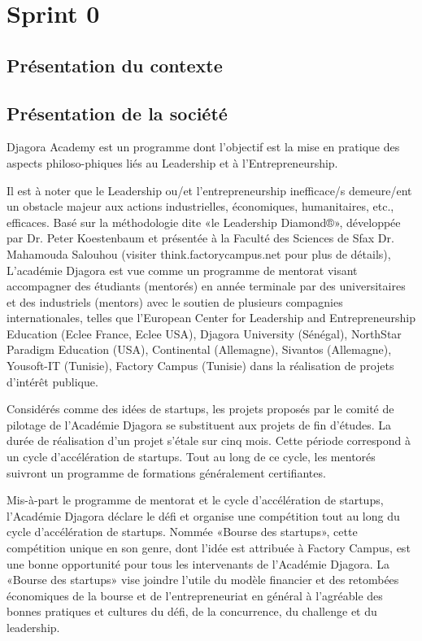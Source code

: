 \section{Sprint 0}
\subsection{Présentation du contexte}

\subsection{Présentation de la société}
Djagora Academy est un programme dont l’objectif est la mise en pratique des 
aspects  philoso-phiques liés au Leadership et à l’Entrepreneurship.

Il est à noter que le Leadership ou/et l’entrepreneurship inefficace/s demeure/ent un obstacle 
majeur aux actions industrielles, économiques, humanitaires, etc., efficaces. 
Basé sur la méthodologie dite «le Leadership Diamond®», développée par
Dr. Peter Koestenbaum et présentée à la Faculté des Sciences de Sfax Dr. Mahamouda
Salouhou (visiter think.factorycampus.net pour plus de détails), L’académie 
Djagora est vue comme un programme de mentorat visant accompagner des étudiants 
(mentorés) en année terminale par des universitaires et des industriels (mentors) 
avec le soutien de plusieurs compagnies internationales, telles que l’European 
Center for Leadership and Entrepreneurship Education (Eclee France, Eclee USA), 
Djagora University (Sénégal), NorthStar Paradigm Education (USA), Continental 
(Allemagne), Sivantos (Allemagne), Yousoft-IT (Tunisie), Factory Campus (Tunisie)
dans la réalisation de projets d’intérêt publique.

Considérés comme des idées de startups, les projets proposés par
le comité de pilotage de l'Académie Djagora se substituent aux projets de fin
d’études.
La durée de réalisation d’un projet s’étale sur cinq mois. Cette période
correspond à un cycle d’accélération de startups. Tout au long de ce cycle,
les mentorés suivront un programme de formations généralement certifiantes.

Mis-à-part le programme de mentorat et le cycle d’accélération de startups, 
l’Académie Djagora déclare le défi et organise une compétition tout au long
du cycle d’accélération de startups. Nommée «Bourse des startups», cette 
compétition unique en son genre, dont l’idée est attribuée à Factory Campus,
est une bonne opportunité pour tous les intervenants de l’Académie Djagora.
La «Bourse des startups» vise joindre l’utile du modèle financier et des retombées 
économiques de la bourse et de l’entrepreneuriat en général à l’agréable des 
bonnes pratiques et cultures du défi, de la concurrence, du challenge et du 
leadership. 
